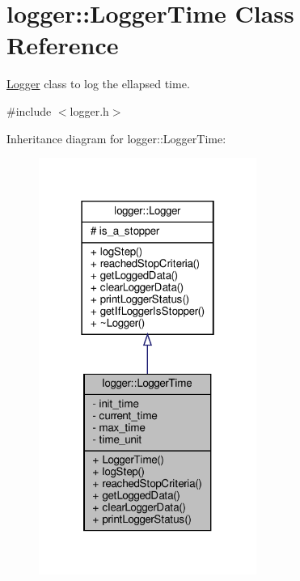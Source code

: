 \hypertarget{classlogger_1_1_logger_time}{}\section{logger\+:\+:Logger\+Time Class Reference}
\label{classlogger_1_1_logger_time}


\hyperlink{classlogger_1_1_logger}{Logger} class to log the ellapsed time.  




{\ttfamily \#include $<$logger.\+h$>$}



Inheritance diagram for logger\+:\+:Logger\+Time\+:
\nopagebreak
\begin{figure}[H]
\begin{center}
\leavevmode
\includegraphics[width=202pt]{classlogger_1_1_logger_time__inherit__graph}
\end{center}
\end{figure}


